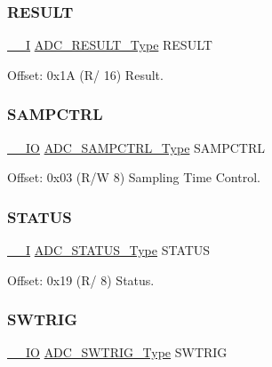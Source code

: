 \subsubsection{\texorpdfstring{RESULT}{RESULT}}
{\footnotesize\ttfamily \mbox{\hyperlink{core__cm0plus_8h_af63697ed9952cc71e1225efe205f6cd3}{\+\_\+\+\_\+I}} \mbox{\hyperlink{union_a_d_c___r_e_s_u_l_t___type}{A\+D\+C\+\_\+\+R\+E\+S\+U\+L\+T\+\_\+\+Type}} R\+E\+S\+U\+LT}



Offset\+: 0x1A (R/ 16) Result. 

\mbox{\label{struct_adc_ab4d44269a58c94c652f134197f428c95}} 
\subsubsection{\texorpdfstring{SAMPCTRL}{SAMPCTRL}}
{\footnotesize\ttfamily \mbox{\hyperlink{core__cm0plus_8h_aec43007d9998a0a0e01faede4133d6be}{\+\_\+\+\_\+\+IO}} \mbox{\hyperlink{union_a_d_c___s_a_m_p_c_t_r_l___type}{A\+D\+C\+\_\+\+S\+A\+M\+P\+C\+T\+R\+L\+\_\+\+Type}} S\+A\+M\+P\+C\+T\+RL}



Offset\+: 0x03 (R/W 8) Sampling Time Control. 

\mbox{\label{struct_adc_a15371d20a1b387f8cb2dae8a5b9c855f}} 
\subsubsection{\texorpdfstring{STATUS}{STATUS}}
{\footnotesize\ttfamily \mbox{\hyperlink{core__cm0plus_8h_af63697ed9952cc71e1225efe205f6cd3}{\+\_\+\+\_\+I}} \mbox{\hyperlink{union_a_d_c___s_t_a_t_u_s___type}{A\+D\+C\+\_\+\+S\+T\+A\+T\+U\+S\+\_\+\+Type}} S\+T\+A\+T\+US}



Offset\+: 0x19 (R/ 8) Status. 

\mbox{\label{struct_adc_a9f54c185286f264f17586934957c3f18}} 
\subsubsection{\texorpdfstring{SWTRIG}{SWTRIG}}
{\footnotesize\ttfamily \mbox{\hyperlink{core__cm0plus_8h_aec43007d9998a0a0e01faede4133d6be}{\+\_\+\+\_\+\+IO}} \mbox{\hyperlink{union_a_d_c___s_w_t_r_i_g___type}{A\+D\+C\+\_\+\+S\+W\+T\+R\+I\+G\+\_\+\+Type}} S\+W\+T\+R\+IG}



